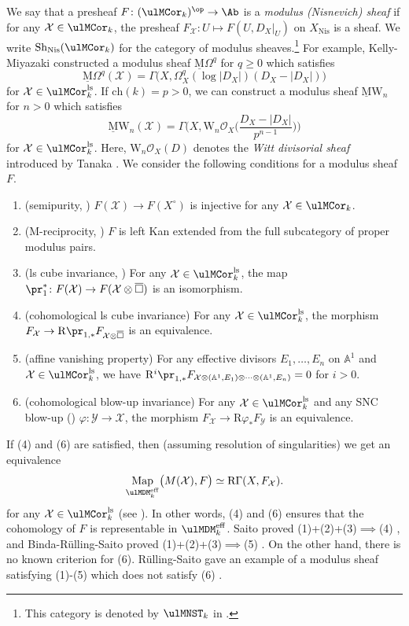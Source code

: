 \documentclass{amsart}
\theoremstyle{plain}
\theoremstyle{definition}
\theoremstyle{remark}
\numberwithin{equation}{section}
\newcommand{\bcube}{{\overline{\square}}}
\DeclareMathOperator{\Sh}{Sh}
\DeclareMathOperator{\Map}{Map}
\def\Nis{\mathrm{Nis}}
\def\eff{\mathrm{eff}}
\def\ch{\mathrm{ch}}
\def\ls{\mathrm{ls}}
\def\MOmega{\underline{\mathrm{M}}\Omega}
\def\MW{\underline{\mathrm{M}}\mathrm{W}}
\begin{document}
We say that a presheaf $F\colon (\ulMCor_k)^\op\to \Ab$ is a \emph{modulus (Nisnevich) sheaf} if for any $\mathcal{X}\in \ulMCor_k$, the presheaf $F_\mathcal{X}\colon U\mapsto F(U,D_X|_U)$ on $X_\Nis$ is a sheaf.
We write $\Sh_\Nis(\ulMCor_k)$ for the category of modulus sheaves.\footnote{This category is denoted by $\ulMNST_k$ in \cite{KMSY3}.}
For example, Kelly-Miyazaki \cite{KellyMiyazaki_Hodge2} constructed a modulus sheaf $\MOmega^q$ for $q\geq 0$ which satisfies
$$
	\MOmega^q(\mathcal{X})=\Gamma\bigl(X,\Omega^q_X(\log|D_X|)(D_X-|D_X|)\bigr)
$$
for $\mathcal{X}\in \ulMCor_k^\ls$.
If $\ch(k)=p>0$, we can construct a modulus sheaf $\MW_n$ for $n>0$ which satisfies
$$
	\MW_n(\mathcal{X})=\Gamma\biggl(X,\mathrm{W}_n\mathcal{O}_X\biggl(\frac{D_X-|D_X|}{p^{n-1}}\biggr)\biggr)
$$
for $\mathcal{X}\in \ulMCor_k^\ls$.
Here, $\mathrm{W}_n\mathcal{O}_X(D)$ denotes the \emph{Witt divisorial sheaf} introduced by Tanaka \cite{Tanaka_Witt}.
We consider the following conditions for a modulus sheaf $F$.
\begin{enumerate}
	\item	(semipurity, \cite[Definition 1.28]{Sai20}) $F(\mathcal{X})\to F(X^\circ)$ is injective for any $\mathcal{X}\in \ulMCor_k$.
	\item	(M-reciprocity, \cite[Definition 1.26]{Sai20}) $F$ is left Kan extended from the full subcategory of proper modulus pairs.
	\item	(ls cube invariance, \cite[Definition 1.12]{Sai20}) For any $\mathcal{X}\in \ulMCor_k^\ls$, the map $\pr_1^*\colon F(\mathcal{X})\to F(\mathcal{X}\otimes\bcube)$ is an isomorphism.
	\item	(cohomological ls cube invariance) For any $\mathcal{X}\in \ulMCor_k^\ls$, the morphism $F_\mathcal{X}\to \mathrm{R}\pr_{1,*}F_{\mathcal{X}\otimes \bcube}$ is an equivalence.
	\item	(affine vanishing property) For any effective divisors $E_1,\dots,E_n$ on $\mathbb{A}^1$ and $\mathcal{X}\in \ulMCor_k^\ls$, we have $\mathrm{R}^i\pr_{1,*}F_{\mathcal{X}\otimes(\mathbb{A}^1,E_1)\otimes\cdots\otimes(\mathbb{A}^1,E_n)}=0$ for $i>0$.
	\item	(cohomological blow-up invariance) For any $\mathcal{X}\in \ulMCor_k^\ls$ and any SNC blow-up () $\varphi\colon \mathcal{Y}\to \mathcal{X}$, the morphism $F_\mathcal{X}\to \mathrm{R}\varphi_* F_{\mathcal{Y}}$ is an equivalence.
\end{enumerate}
If (4) and (6) are satisfied, then (assuming resolution of singularities) we get an equivalence
$$
	\Map_{\ulMDM^\eff_k}\bigl(M(\mathcal{X}),F\bigr) \simeq \mathrm{R}\Gamma(X,F_\mathcal{X}).
$$
for any $\mathcal{X}\in \ulMCor_k^\ls$ (see ).
In other words, (4) and (6) ensures that the cohomology of $F$ is representable in $\ulMDM^\eff_k$.
Saito proved (1)+(2)+(3)$\implies$(4) \cite[Theorem 0.6]{Sai20}, and Binda-R\"ulling-Saito proved (1)+(2)+(3)$\implies$(5) \cite[Lemma 2.10]{BRS}.
On the other hand, there is no known criterion for (6).
R\"ulling-Saito gave an example of a modulus sheaf satisfying (1)-(5) which does not satisfy (6) \cite[{}6.9]{RSram3}.
\end{document}

